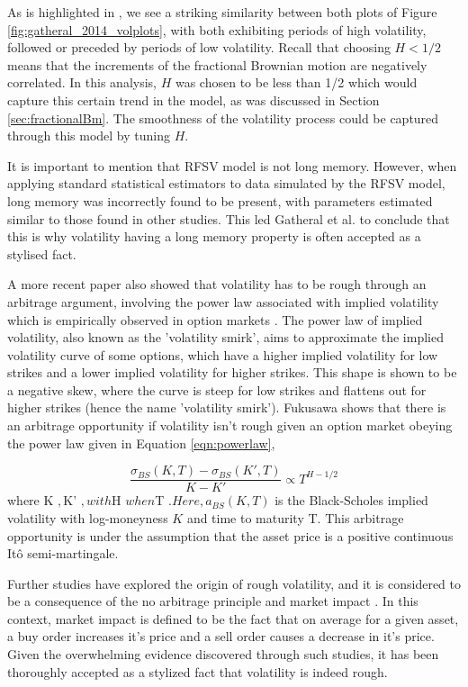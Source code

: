 \documentclass[12pt,oneside]{article}
\begin{document}
As is highlighted in \cite{gatheral2014volatility}, we see a striking similarity between both plots of Figure \ref{fig:gatheral_2014_volplots}, with both exhibiting periods of high volatility, followed or preceded by periods of low volatility. Recall that choosing $H<1/2$ means that the increments of the fractional Brownian motion are negatively correlated. In this analysis, $H$ was chosen to be less than 1/2 which would capture this certain trend in the model, as was discussed in Section \ref{sec:fractionalBm}. The smoothness of the volatility process could be captured through this model by tuning $H$.

It is important to mention that RFSV model is not long memory. However, when applying standard statistical estimators to data simulated by the RFSV model, long memory was incorrectly found to be present, with parameters estimated similar to those found in other studies. This led Gatheral et al. to conclude that this is why volatility having a long memory property is often accepted as a stylised fact. 

A more recent paper \cite{fukasawa2020volatility} also showed that volatility has to be rough through an arbitrage argument, involving the power law associated with implied volatility which is empirically observed in option markets \cite{Carr2001}. The power law of implied volatility, also known as the 'volatility smirk', aims to approximate the implied volatility curve of some options, which have a higher implied volatility for low strikes and a lower implied volatility for higher strikes. This shape is shown to be a negative skew, where the curve is steep for low strikes and flattens out for higher strikes (hence the name 'volatility smirk'). Fukusawa \cite{fukasawa2020volatility} shows that there is an arbitrage opportunity if volatility isn't rough given an option market obeying the power law given in Equation \ref{eqn:powerlaw},

\begin{equation}
\label{eqn:powerlaw}
\frac{\sigma_{BS}(K,T) - \sigma_{BS}(K',T)}{K-K'}\propto T^{H-1/2}
\end{equation}
where K $, $K' $, with $H $ when $T $. Here, $\sigm$a_{BS}(K,T)$ is the Black-Scholes implied volatility with log-moneyness $K$ and time to maturity T. This arbitrage opportunity is under the assumption that the asset price is a positive continuous It\^o semi-martingale.

Further studies have explored the origin of rough volatility, and it is considered to be a consequence of the no arbitrage principle and market impact \cite{jusselin2018noarbitrage}. In this context, market impact is defined to be the fact that on average for a given asset, a buy order increases it's price and a sell order causes a decrease in it's price. Given the overwhelming evidence discovered through such studies, it has been thoroughly accepted as a stylized fact that volatility is indeed rough.
\end{document}
